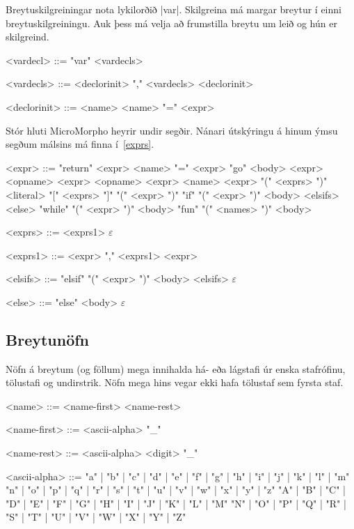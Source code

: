 \documentclass[12pt]{article}
\makeatletter
\newenvironment{bnf}[2]{%
    \setlength{\grammarindent}{\widthof{\synt{#2}::=} + 0.85em}
    \def\@grammarname{#1}
    \begin{grammarfloat}[H]
    \begin{mdframed}[style=langframe]
    \vspace{-\grammarparsep}
    \begin{grammar}
}{%
    \end{grammar}
    \end{mdframed}
    \vspace{-10pt}
    \caption{\@grammarname}
    \end{grammarfloat}
    \setlength{\grammarindent}{2em}
}
\renewcommand*{\empty}{\ensuremath{\varepsilon}}
\makeatother
\begin{document}
Breytuskilgreiningar nota lykilorðið |var|.
Skilgreina má margar breytur í einni breytuskilgreiningu.
Auk þess má velja að frumstilla breytu um leið og hún er skilgreind.

\begin{bnf}{Breytuskilgreining}{declorinit}
    <vardecl> ::= "var" <vardecls>

    <vardecls> ::= <declorinit> "," <vardecls>
              \alt <declorinit>

    <declorinit> ::= <name>
                \alt <name> "=" <expr>
\end{bnf}

Stór hluti MicroMorpho heyrir undir segðir.
Nánari útskýringu á hinum ýmsu segðum málsins má
finna í~\ref{exprs}.

\begin{bnf}{Segðir}{exprs1}
    <expr> ::= "return" <expr>
          \alt <name> "=" <expr>
          \alt "go" <body>
          \alt <expr> <opname> <expr>
          \alt <opname> <expr>
          \alt <name>
          \alt <expr> "(" <exprs> ")"
          \alt <literal>
          \alt "[" <exprs> "]"
          \alt "(" <expr> ")"
          \alt "if" "(" <expr> ")" <body> <elsifs> <else>
          \alt "while" "(" <expr> ")" <body>
          \alt "fun" "(" <names> ")" <body>

    <exprs> ::= <exprs1>
           \alt \empty

    <exprs1> ::= <expr> "," <exprs1>
            \alt <expr>

    <elsifs> ::= "elsif" "(" <expr> ")" <body> <elsifs>
            \alt \empty

    <else> ::= "else" <body>
          \alt \empty
\end{bnf}

\subsection{Breytunöfn}
Nöfn á breytum (og föllum) mega innihalda
há- eða lágstafi úr enska stafrófinu,
tölustafi og undirstrik.
Nöfn mega hins vegar ekki hafa tölustaf sem fyrsta staf.

\begin{bnf}{Breytunöfn}{ascii-alpha}
    <name> ::= <name-first> <name-rest>

    <name-first> ::= <ascii-alpha>
                \alt "_"

    <name-rest> ::= <ascii-alpha>
               \alt <digit>
               \alt "_"

    <ascii-alpha> ::= "a" | "b" | "c" | "d" | "e" | "f" | "g"
                          | "h" | "i" | "j" | "k" | "l" | "m" 
                 \alt "n" | "o" | "p" | "q" | "r" | "s" | "t"
                          | "u" | "v" | "w" | "x" | "y" | "z" 
                 \alt "A" | "B" | "C" | "D" | "E" | "F" | "G"
                          | "H" | "I" | "J" | "K" | "L" | "M"
                 \alt "N" | "O" | "P" | "Q" | "R" | "S" | "T"
                          | "U" | "V" | "W" | "X" | "Y" | "Z" 
\end{bnf}
\end{document}
